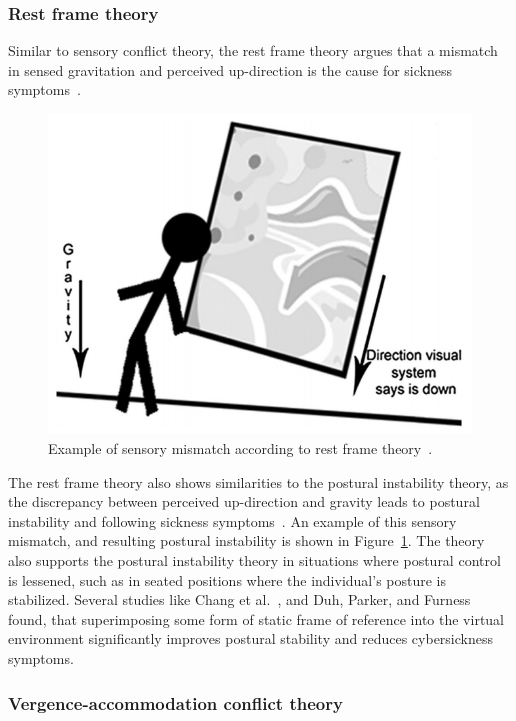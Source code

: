 \subsubsection{Rest frame theory}
Similar to sensory conflict theory, the rest frame theory argues that a mismatch in sensed gravitation and perceived
up-direction is the cause for sickness symptoms~\cite{Rebenitsch2016}.
\begin{figure}[h]
    \centering
    \includegraphics[width=\textwidth/2]{content/related_work/img/SensoryMismatchRestFrame[Rebenitsch2016]}
    \caption{Example of sensory mismatch according to rest frame theory~\cite{Rebenitsch2016}.}
    \label{fig:sensory-mismatch-example}
\end{figure}
The rest frame theory also shows similarities to the postural instability theory, as the discrepancy between perceived
up-direction and gravity leads to postural instability and following sickness symptoms~\cite{Rebenitsch2016}.
An example of this sensory mismatch, and resulting postural instability is shown in
Figure~\ref{fig:sensory-mismatch-example}.
The theory also supports the postural instability theory in situations where postural control is lessened, such as in
seated positions where the individual's posture is stabilized.
Several studies like Chang et al.~\cite{Chang2013}, and Duh, Parker, and Furness~\cite{Duh2001b} found, that
superimposing some form of static frame of reference into the virtual environment significantly improves postural
stability and reduces cybersickness symptoms.


\subsubsection{Vergence-accommodation conflict theory}\label{subsubsec:vergence-accommodation-conflict-theory}

